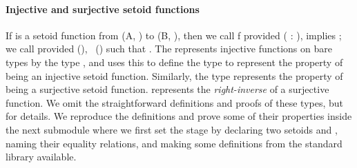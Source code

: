 \paragraph*{Injective and surjective setoid functions}
If  %
is a setoid function from %
(\ab A, ) to
(\ab B, ), then we call \ab f  provided
 (  \as : ),       
implies   ; we call   provided
 (), ~() such that     .
The \agdastdlib represents injective functions on bare types by the
type , and uses this to define the  type to represent
the property of being an injective setoid function. Similarly, the type 
represents the property of being a surjective setoid function.  represents the \emph{right-inverse} of a surjective function.
\ifshort %
 We omit the straightforward definitions and proofs of these types, but \seeshort for details.
\else    %
 We reproduce the definitions and prove some of their properties
 inside the next submodule where we first set the stage by declaring two
 setoids  and , naming their equality relations, and making some
 definitions from the standard library available.

